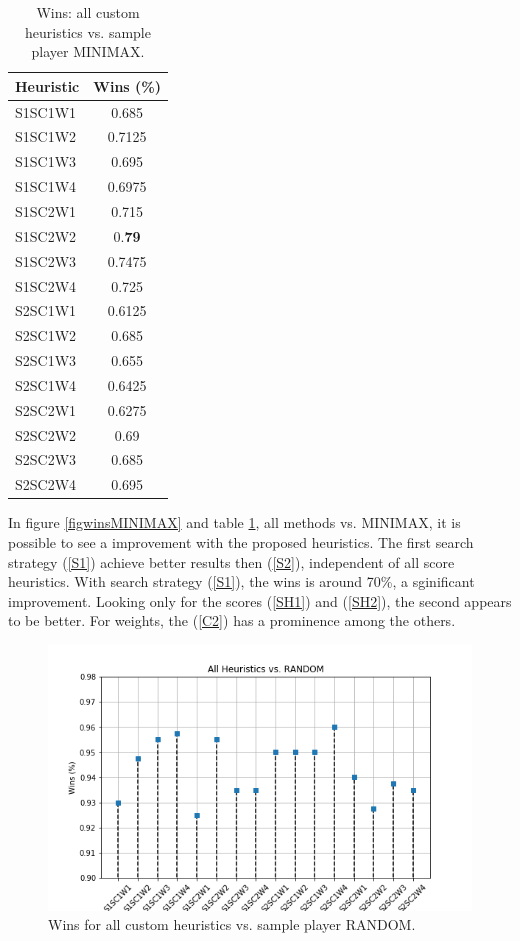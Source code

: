 \documentclass[a4paper]{article}
\begin{document}
    \begin{table}[htpb]
    \caption{ Wins: all custom heuristics vs. sample player MINIMAX.}
    \centering
    \begin{tabular}{ l | c }
    Heuristic & Wins (\%) \\ \hline 
    S1SC1W1 & 0.685 \\
    S1SC1W2 & 0.7125 \\
    S1SC1W3 & 0.695 \\
    S1SC1W4 & 0.6975 \\
    S1SC2W1 & 0.715 \\
    S1SC2W2 & 0.\textbf{79} \\
    S1SC2W3 & 0.7475 \\
    S1SC2W4 & 0.725 \\
    S2SC1W1 & 0.6125 \\
    S2SC1W2 & 0.685 \\
    S2SC1W3 & 0.655 \\
    S2SC1W4 & 0.6425 \\
    S2SC2W1 & 0.6275 \\
    S2SC2W2 & 0.69 \\
    S2SC2W3 & 0.685 \\
    S2SC2W4 & 0.695 
    \end{tabular}
    \label{tabwinsMINIMAX}
    \end{table}


In figure \ref{figwinsMINIMAX} and table \ref{tabwinsMINIMAX}, all methods vs. MINIMAX, it is possible to see a improvement with the proposed heuristics. The first search strategy (\ref{S1}) achieve better results then (\ref{S2}), independent of all score heuristics. With search strategy (\ref{S1}), the wins is around 70\%, a sginificant improvement. Looking only for the scores (\ref{SH1}) and (\ref{SH2}), the second appears to be better. For weights, the (\ref{C2}) has a prominence among the others.
    


\begin{figure}[htpb]
\begin{center}
\includegraphics[width=1\columnwidth]{fig/results_Wins_All_vs_RANDOM.png}
\caption{Wins for all custom heuristics vs. sample player RANDOM.}
\end{center}
\label{figwinsRANDOM}
\end{figure}
    
\end{document}
